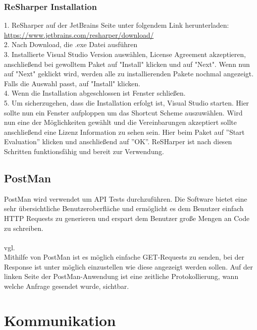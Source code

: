 \subsubsection{ReSharper Installation}
\label{sec:ReSharperInstallation}
1. ReSharper auf der JetBrains Seite unter folgendem Link herunterladen: \break \url {https://www.jetbrains.com/resharper/download/} \\
2. Nach Download, die .exe Datei ausführen \\
3. Installierte Visual Studio Version auswählen, License Agreement akzeptieren, anschließend bei gewolltem Paket auf "Install" klicken und auf "Next". 
Wenn nun auf "Next" geklickt wird, werden alle zu installierenden Pakete nochmal angezeigt. Falls die Auswahl passt, auf "Install" klicken. \\
4. Wenn die Installation abgeschlossen ist Fenster schließen. \\
5. Um sicherzugehen, dass die Installation erfolgt ist, Visual Studio starten. Hier sollte nun ein Fenster aufploppen um das Shortcut Scheme auszuwählen.
Wird nun eine der Möglichkeiten gewählt und die Vereinbarungen akzeptiert sollte anschließend eine Lizenz Information zu sehen sein. Hier beim Paket auf ''Start Evaluation'' klicken und anschließend auf ''OK''. ReSHarper ist nach diesen Schritten funktionsfähig und bereit zur Verwendung.
\subsection {PostMan}
\label{sec:PostMan}
PostMan wird verwendet um API Tests durchzuführen. Die Software bietet eine sehr übersichtliche Benutzeroberfläche und ermöglicht es dem Benutzer einfach HTTP Requests zu generieren und erspart dem Benutzer große Mengen an Code zu schreiben. \\
\\vgl. \cite{TechnologiePostman} \\ \break
Mithilfe von PostMan ist es möglich einfache GET-Requests zu senden, bei der Response ist unter möglich einzustellen wie diese angezeigt werden sollen. Auf der linken Seite der PostMan-Anwendung ist eine zeitliche Protokollierung, wann welche Anfrage gesendet wurde, sichtbar.
\section{Kommunikation}
\label{sec:Kommunikation}
